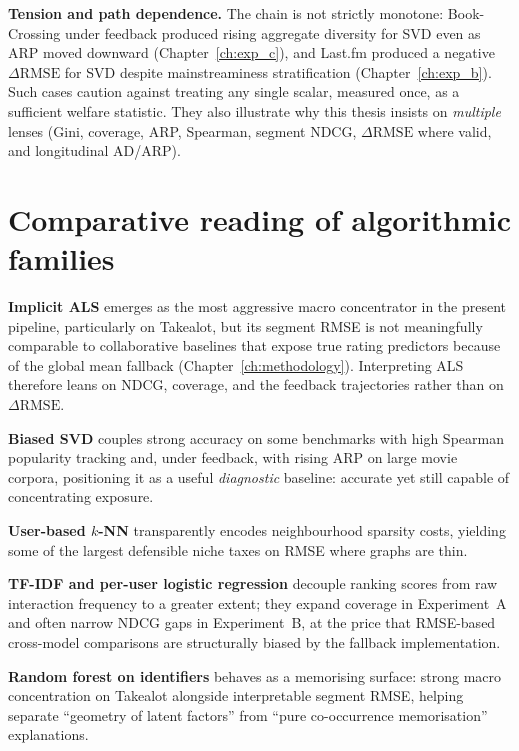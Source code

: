 \textbf{Tension and path dependence.} The chain is not strictly monotone: Book-Crossing under feedback produced rising aggregate diversity for SVD even as ARP moved downward (Chapter~\ref{ch:exp_c}), and Last.fm produced a negative $\Delta\mathrm{RMSE}$ for SVD despite mainstreaminess stratification (Chapter~\ref{ch:exp_b}). Such cases caution against treating any single scalar, measured once, as a sufficient welfare statistic. They also illustrate why this thesis insists on \emph{multiple} lenses (Gini, coverage, ARP, Spearman, segment NDCG, $\Delta\mathrm{RMSE}$ where valid, and longitudinal AD/ARP).

\section{Comparative reading of algorithmic families}
\textbf{Implicit ALS} emerges as the most aggressive macro concentrator in the present pipeline, particularly on Takealot, but its segment RMSE is not meaningfully comparable to collaborative baselines that expose true rating predictors because of the global mean fallback (Chapter~\ref{ch:methodology}). Interpreting ALS therefore leans on NDCG, coverage, and the feedback trajectories rather than on $\Delta\mathrm{RMSE}$.

\textbf{Biased SVD} couples strong accuracy on some benchmarks with high Spearman popularity tracking and, under feedback, with rising ARP on large movie corpora, positioning it as a useful \emph{diagnostic} baseline: accurate yet still capable of concentrating exposure.

\textbf{User-based $k$-NN} transparently encodes neighbourhood sparsity costs, yielding some of the largest defensible niche taxes on RMSE where graphs are thin.

\textbf{TF-IDF and per-user logistic regression} decouple ranking scores from raw interaction frequency to a greater extent; they expand coverage in Experiment~A and often narrow NDCG gaps in Experiment~B, at the price that RMSE-based cross-model comparisons are structurally biased by the fallback implementation.

\textbf{Random forest on identifiers} behaves as a memorising surface: strong macro concentration on Takealot alongside interpretable segment RMSE, helping separate ``geometry of latent factors'' from ``pure co-occurrence memorisation'' explanations.

